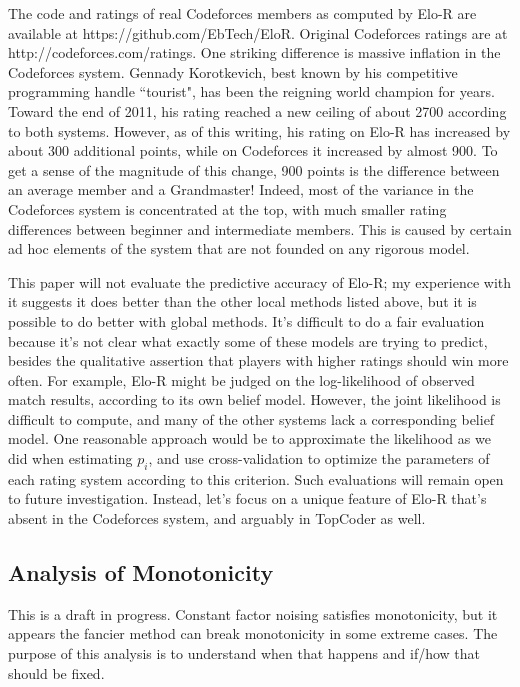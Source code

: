 The code and ratings of real Codeforces members as computed by Elo-R are available at https://github.com/EbTech/EloR. Original Codeforces ratings are at http://codeforces.com/ratings. One striking difference is massive inflation in the Codeforces system. Gennady Korotkevich, best known by his competitive programming handle ``tourist", has been the reigning world champion for years. Toward the end of 2011, his rating reached a new ceiling of about 2700 according to both systems. However, as of this writing, his rating on Elo-R has increased by about 300 additional points, while on Codeforces it increased by almost 900. To get a sense of the magnitude of this change, 900 points is the difference between an average member and a Grandmaster! Indeed, most of the variance in the Codeforces system is concentrated at the top, with much smaller rating differences between beginner and intermediate members. This is caused by certain ad hoc elements of the system that are not founded on any rigorous model.

This paper will not evaluate the predictive accuracy of Elo-R; my experience with it suggests it does better than the other local methods listed above, but it is possible to do better with global methods. It's difficult to do a fair evaluation because it's not clear what exactly some of these models are trying to predict, besides the qualitative assertion that players with higher ratings should win more often. For example, Elo-R might be judged on the log-likelihood of observed match results, according to its own belief model. However, the joint likelihood is difficult to compute, and many of the other systems lack a corresponding belief model. One reasonable approach would be to approximate the likelihood as we did when estimating $p_i$, and use cross-validation to optimize the parameters of each rating system according to this criterion. Such evaluations will remain open to future investigation. Instead, let's focus on a unique feature of Elo-R that's absent in the Codeforces system, and arguably in TopCoder as well.

\subsection{Analysis of Monotonicity}

This is a draft in progress. Constant factor noising satisfies monotonicity, but it appears the fancier method can break monotonicity in some extreme cases. The purpose of this analysis is to understand when that happens and if/how that should be fixed.

